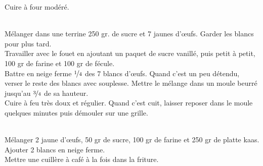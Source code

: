 \begin{minipage}[c]{\textwidth}
Cuire à four modéré.\\
\\

\end{minipage}

\begin{minipage}[c]{\textwidth}
Mélanger dans une terrine 250 gr. de sucre et 7 jaunes d’œufs. Garder les blancs pour plus tard.\\
Travailler avec le fouet en ajoutant un paquet de sucre vanillé, puis petit à petit, 100 gr de farine et 100 gr de fécule.\\
Battre en neige ferme $\nicefrac{1}{4}$ des 7 blancs d’œufs. Quand c’est un peu détendu, verser le reste des blancs avec souplesse. Mettre le mélange dans un moule beurré jusqu’au $\nicefrac{3}{4}$ de sa hauteur. \\
Cuire à feu très doux et régulier. Quand c’est cuit, laisser reposer dans le moule quelques minutes puis démouler sur une grille.\\
\\

\end{minipage}

\begin{minipage}[c]{\textwidth}
Mélanger 2 jaune d’œufs, 50 gr de sucre, 100 gr de farine et 250 gr de platte kaas.\\
Ajouter 2 blancs en neige ferme.\\
Mettre une cuillère à café à la fois dans la friture.	\\
\\

\end{minipage}

